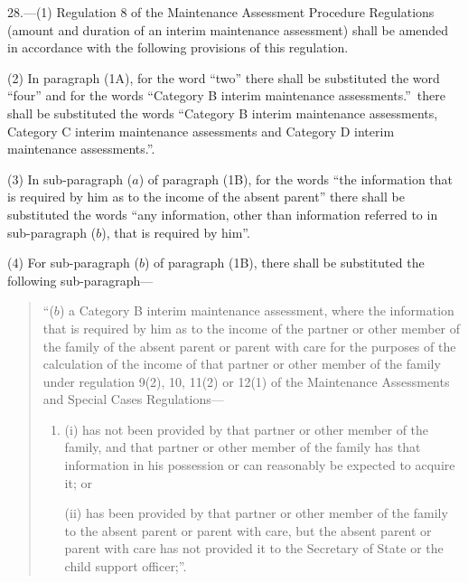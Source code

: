 \documentclass[a4paper]{article}
\begin{document}
28.—(1) Regulation 8 of the Maintenance Assessment Procedure Regulations (amount and duration of an interim maintenance assessment) shall be amended in accordance with the following provisions of this regulation.

(2) In paragraph (1A), for the word “two” there shall be substituted the word “four” and for the words “Category B interim maintenance assessments.”\ there shall be substituted the words “Category B interim maintenance assessments, Category C interim maintenance assessments and Category D interim maintenance assessments.”.

(3) In sub-paragraph ($a$) of paragraph (1B), for the words “the information that is required by him as to the income of the absent parent” there shall be substituted the words “any information, other than information referred to in sub-paragraph ($b$), that is required by him”.

(4) For sub-paragraph ($b$) of paragraph (1B), there shall be substituted the following sub-paragraph—
\begin{quotation}
“($b$) a Category B interim maintenance assessment, where the information that is required by him as to the income of the partner or other member of the family of the absent parent or parent with care for the purposes of the calculation of the income of that partner or other member of the family under regulation 9(2), 10, 11(2) or 12(1) of the Maintenance Assessments and Special Cases Regulations—
\begin{enumerate}\item[]
(i) has not been provided by that partner or other member of the family, and that partner or other member of the family has that information in his possession or can reasonably be expected to acquire it; or

(ii) has been provided by that partner or other member of the family to the absent parent or parent with care, but the absent parent or parent with care has not provided it to the Secretary of State or the child support officer;”.
\end{enumerate}
\end{quotation}
\end{document}
